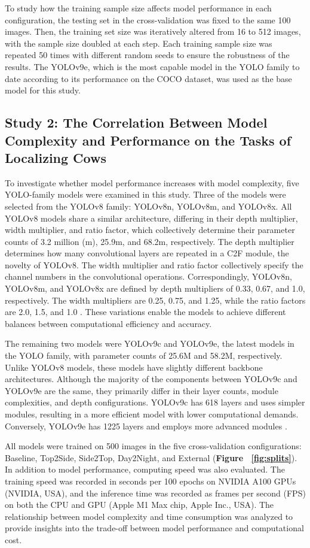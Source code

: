 To study how the training sample size affects model performance in each configuration, the testing set in the cross-validation was fixed to the same 100 images. Then, the training set size was iteratively altered from 16 to 512 images, with the sample size doubled at each step. Each training sample size was repeated 50 times with different random seeds to ensure the robustness of the results. The YOLOv9e, which is the most capable model in the YOLO family to date according to its performance on the COCO dataset, was used as the base model for this study.

\subsection{Study 2:  The Correlation Between Model Complexity and Performance on the Tasks of Localizing Cows}
To investigate whether model performance increases with model complexity, five YOLO-family models were examined in this study. Three of the models were selected from the YOLOv8 family: YOLOv8n, YOLOv8m, and YOLOv8x. All YOLOv8 models share a similar architecture, differing in their depth multiplier, width multiplier, and ratio factor, which collectively determine their parameter counts of 3.2 million (m), 25.9m, and 68.2m, respectively. The depth multiplier determines how many convolutional layers are repeated in a C2F module, the novelty of YOLOv8. The width multiplier and ratio factor collectively specify the channel numbers in the convolutional operations. Correspondingly, YOLOv8n, YOLOv8m, and YOLOv8x are defined by depth multipliers of 0.33, 0.67, and 1.0, respectively. The width multipliers are 0.25, 0.75, and 1.25, while the ratio factors are 2.0, 1.5, and 1.0 \cite{v8yaml}. These variations enable the models to achieve different balances between computational efficiency and accuracy.

The remaining two models were YOLOv9c and YOLOv9e, the latest models in the YOLO family, with parameter counts of 25.6M and 58.2M, respectively. Unlike YOLOv8 models, these models have slightly different backbone architectures. Although the majority of the components between YOLOv9c and YOLOv9e are the same, they primarily differ in their layer counts, module complexities, and depth configurations. YOLOv9c has 618 layers and uses simpler modules, resulting in a more efficient model with lower computational demands. Conversely, YOLOv9e has 1225 layers and employs more advanced modules \cite{v9yaml}. 

All models were trained on 500 images in the five cross-validation configurations: Baseline, Top2Side, Side2Top, Day2Night, and External (\textbf{Figure ~\ref{fig:splits}}). In addition to model performance, computing speed was also evaluated. The training speed was recorded in seconds per 100 epochs on NVIDIA A100 GPUs (NVIDIA, USA), and the inference time was recorded as frames per second (FPS) on both the CPU and GPU (Apple M1 Max chip, Apple Inc., USA). The relationship between model complexity and time consumption was analyzed to provide insights into the trade-off between model performance and computational cost.
